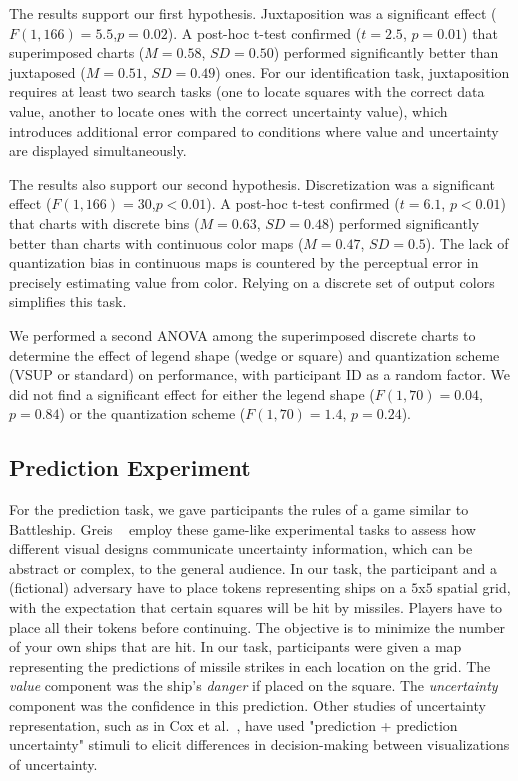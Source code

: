 The results support our first hypothesis. Juxtaposition was a significant effect ($F(1,166)=5.5$,$p=0.02$). A post-hoc t-test confirmed ($t=2.5$, $p=0.01$) that superimposed charts ($M=0.58$, $SD=0.50$) performed significantly better than juxtaposed ($M=0.51$, $SD=0.49$) ones. For our identification task, juxtaposition requires at least two search tasks (one to locate squares with the correct data value, another to locate ones with the correct uncertainty value), which introduces additional error compared to conditions where value and uncertainty are displayed simultaneously. 

The results also support our second hypothesis. Discretization was a significant effect ($F(1,166)=30$,$p<0.01$). A post-hoc t-test confirmed ($t=6.1$, $p<0.01$) that charts with discrete bins ($M=0.63$, $SD=0.48$) performed significantly better than charts with continuous color maps ($M=0.47$, $SD=0.5$). The lack of quantization bias in continuous maps is countered by the perceptual error in precisely estimating value from color. Relying on a discrete set of output colors simplifies this task.

We performed a second ANOVA among the superimposed discrete charts to determine the effect of legend shape (wedge or square) and quantization scheme (VSUP or standard) on performance, with participant ID as a random factor. We did not find a significant effect for either the legend shape ($F(1,70)=0.04$, $p=0.84$) or the quantization scheme ($F(1,70)=1.4$, $p=0.24$).

\subsection{Prediction Experiment}

\taskTwoFig

For the prediction task, we gave participants the rules of a game similar to Battleship. Greis \ea~\cite{greis2016decision} employ these game-like experimental tasks to assess how different visual designs communicate uncertainty information, which can be abstract or complex, to the general audience. In our task, the participant and a (fictional) adversary have to place tokens representing ships on a $5$x$5$ spatial grid, with the expectation that certain squares will be hit by missiles. Players have to place all their tokens before continuing. The objective is to minimize the number of your own ships that are hit. In our task, participants were given a map representing the predictions of missile strikes in each location on the grid. The \emph{value} component was the ship's \emph{danger} if placed on the square. The \emph{uncertainty} component was the confidence in this prediction. Other studies of uncertainty representation, such as in Cox et al.~\cite{cox2013visualizing}, have used "prediction + prediction uncertainty" stimuli to elicit differences in decision-making between visualizations of uncertainty.

